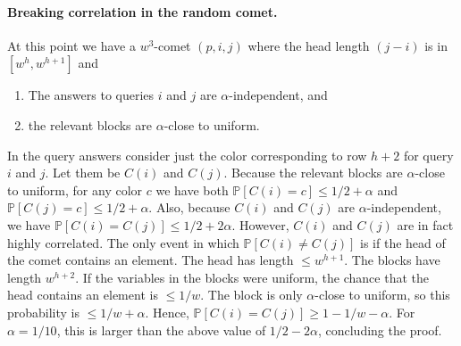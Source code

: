 \paragraph{Breaking correlation in the random comet.}
At this point we have a $w^3$-comet $(p,i,j)$ where the head length $(j-i)$ is in $[w^h,w^{h+1}]$ and
\begin{enumerate}
\item The answers to queries $i$ and $j$ are $\alpha$-independent, and
\item the relevant blocks are $\alpha$-close to uniform.
\end{enumerate}
In the query answers consider just the color corresponding to row $h+2$ for query $i$ and $j$. Let them be $C(i)$ and $C(j)$.
Because the relevant blocks are $\alpha$-close to uniform, for any color $c$ we have both $\mathbb P[C(i)=c]\leq1/2+\alpha$ and $\mathbb P[C(j)=c]\leq1/2+\alpha$. Also, because $C(i)$ and $C(j)$ are $\alpha$-independent, we have $\mathbb P[C(i)=C(j)]\leq1/2+2\alpha$.
However, $C(i)$ and $C(j)$ are in fact highly correlated. The only event in which $\mathbb P[C(i)\neq C(j)]$ is if the head of the comet contains an element. The head has length $\leq w^{h+1}$. The blocks have length $w^{h+2}$. If the variables in the blocks were uniform, the chance that the head contains an element is $\leq1/w$. The block is only $\alpha$-close to uniform, so this probability is $\leq1/w+\alpha$. Hence, $\mathbb P[C(i)=C(j)]\geq1-1/w-\alpha$. For $\alpha=1/10$, this is larger than the above value of $1/2-2\alpha$, concluding the proof.
